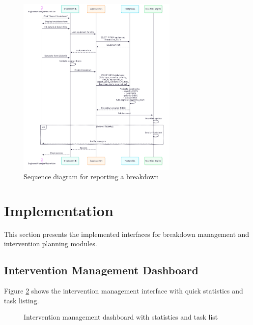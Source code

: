 \begin{figure}[H]
\centering
\includegraphics[width=0.7\textwidth]{img/chap_05/sprint3_sequence_breakdown.png}
\caption{Sequence diagram for reporting a breakdown}
\label{fig:sprint3-seq2}
\end{figure}

\section{Implementation}

This section presents the implemented interfaces for breakdown management and intervention planning modules.

\subsection{Intervention Management Dashboard}

Figure \ref{fig:sprint3-impl1} shows the intervention management interface with quick statistics and task listing.

\begin{figure}[H]
\centering
{}
\caption{Intervention management dashboard with statistics and task list}
\label{fig:sprint3-impl1}
\end{figure}

